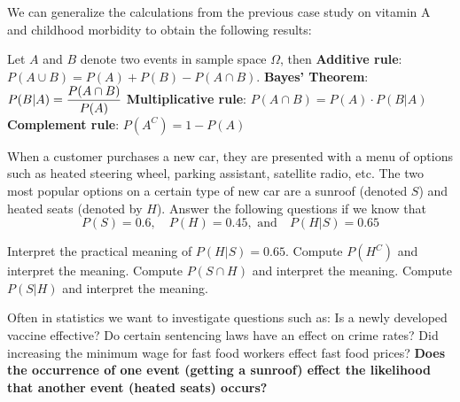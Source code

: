 






\clearpage
{}

We can generalize the calculations from the previous case study on vitamin A and childhood morbidity to obtain the following results:

\bbox
\begin{theorem}
Let $A$ and $B$ denote two events in sample space $\Omega$, then
\bi
\ii \textbf{\alert{Additive rule}}: $P(A \cup B) = P(A) + P(B) - P(A \cap B)$.
\ii \textbf{\alert{Bayes' Theorem}}: $\displaystyle P(B | A) = \frac{P(A \cap B)}{P(A)}$
\ii \textbf{\alert{Multiplicative rule}}: $P(A \cap B) = P(A) \cdot P(B | A)$
\ii \textbf{\alert{Complement rule}}: $P(A^C) = 1 - P(A)$
\ei
\end{theorem}
\ebox

\bb[resume] 
\ii When a customer purchases a new car, they are presented with a menu of options such as heated steering wheel, parking assistant, satellite radio, etc. The two most popular options on a certain type of new car are a sunroof (denoted $S$) and heated seats (denoted by $H$). Answer the following questions if we know that 
\[ P(S) = 0.6, \quad P(H) = 0.45,\mbox{ and} \quad P(H | S ) = 0.65 \] \label{q:cars}

\bb
\ii Interpret the practical meaning of $P(H | S ) = 0.65$. \vfill
\ii Compute $P(H^C)$ and interpret the meaning. \vfill
\ii Compute $P(S \cap H)$ and interpret the meaning. \vfill
\ii Compute $P(S | H)$ and interpret the meaning. \vfill
\ee
\ee

\clearpage


Often in statistics we want to investigate questions such as:
\bi
\ii Is a newly developed vaccine effective?
\ii Do certain sentencing laws have an effect on crime rates?
\ii Did increasing the minimum wage for fast food workers effect fast food prices?
\ii \textbf{Does the occurrence of one event (getting a sunroof) effect the likelihood that another event (heated seats) occurs?}
\ei


